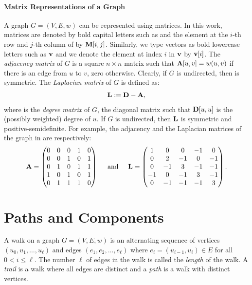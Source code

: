 \paragraph{Matrix Representations of a Graph}
A graph $G = (V, E, w)$ can be represented using matrices. In this work,
matrices are denoted by bold capital letters such as  and the element
at the $i$-th row and $j$-th column of  by $\mathbf{M}[i, j]$. Similarly,
we type vectors as bold lowercase letters such as $\mathbf{v}$ and we denote the
element at index $i$ in $\mathbf{v}$ by $\mathbf{v}[i]$. The \emph{adjacency
matrix} \Adj of $G$ is a square $n \times n$ matrix such that $\mathbf{A}[u,v] = w(u,
v)$ if there is an edge from $u$ to $v$, zero otherwise. Clearly, if $G$ is
undirected, then \Adj is symmetric. The \emph{Laplacian matrix} \Lapl of $G$ is
defined as:
%
\[\mathbf{L} := \mathbf{D} - \mathbf{A},\]
%
where \Deg is the \emph{degree matrix} of $G$, \ie the diagonal matrix
such that $\mathbf{D}[u,u]$ is the (possibly weighted) degree of $u$.
If $G$ is undirected, then $\mathbf{L}$ is symmetric and positive-semidefinite.
For example, the adjacency and the Laplacian matrices of the graph
in  are respectively:
%
\[
\mathbf{A} =
\begin{pmatrix}
0 & 0 & 0 & 1 & 0\\
0 & 0 & 1 & 0 & 1\\
0 & 1 & 0 & 1 & 1\\
1 & 0 & 1 & 0 & 1\\
0 & 1 & 1 & 1 & 0\\
\end{pmatrix}\hspace{5mm}
\text{and}\hspace{5mm}
\mathbf{L} =
\begin{pmatrix}
1 & 0 & 0 & -1 & 0\\
0 & 2 & -1 & 0 & -1\\
0 & -1 & 3 & -1 & -1\\
-1 & 0 & -1 & 3 & -1\\
0 & -1 & -1 & -1 & 3\\
\end{pmatrix}.
\]

%
\section{Paths and Components}
%
\begin{definition}
A walk on a graph $G = (V, E, w)$ is an alternating sequence of vertices
$(u_0, u_1, \ldots, u_\ell)$ and edges $(e_1, e_2, \ldots, e_\ell)$
where $e_i = (u_{i - 1}, u_i) \in E$ for all $0 < i \le \ell$.
The number $\ell$ of edges in the walk is called the \emph{length} of the walk.
A \emph{trail} is a walk where all edges are distinct and a \emph{path}
is a walk with distinct vertices.
\end{definition}

